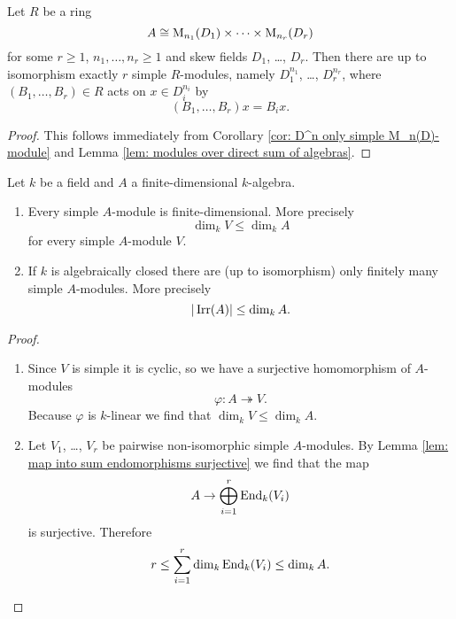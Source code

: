 \begin{cor}\label{cor: simple modules over product of matrix algebras}
  Let $R$ be a ring
  \[
                  A
    \cong         \operatorname{M}_{n_1}(D_1)
          \times  \dotsb
          \times  \operatorname{M}_{n_r}(D_r)
  \]
  for some $r \geq 1$, $n_1, \dotsc, n_r \geq 1$ and skew fields $D_1$, \dots, $D_r$.
  Then there are up to isomorphism exactly $r$ simple $R$-modules, namely $D_1^{n_1}$, \dots, $D_r^{n_r}$, where $(B_1, \dotsc, B_r) \in R$ acts on $x \in D_i^{n_i}$ by
  \[
      (B_1, \dotsc, B_r) x
    =  B_i x.
  \]
\end{cor}
\begin{proof}
  This follows immediately from Corollary \ref{cor: D^n only simple M_n(D)-module} and Lemma \ref{lem: modules over direct sum of algebras}.
\end{proof}


\begin{prop}\label{prop: simple modules over finite-dimensional algebras}
  Let $k$ be a field and $A$ a finite-dimensional $k$-algebra.
  \begin{enumerate}[label=\emph{\alph*)},leftmargin=*]
    \item
      Every simple $A$-module is finite-dimensional.
      More precisely
      \[
        \dim_k V \leq \dim_k A
      \]
      for every simple $A$-module $V$.
    \item
      If $k$ is algebraically closed there are (up to isomorphism) only finitely many simple $A$-modules. More precisely
      \[
        |\operatorname{Irr}(A)| \leq \dim_k A.
      \]
  \end{enumerate}
\end{prop}
\begin{proof}
  \begin{enumerate}[label=\emph{\alph*)},leftmargin=*]
    \item
      Since $V$ is simple it is cyclic, so we have a surjective homomorphism of $A$-modules
      \[
                            \varphi
        \colon              A
        \twoheadrightarrow  V.
      \]
      Because $\varphi$ is $k$-linear we find that $\dim_k V \leq \dim_k A$.
    \item
      Let $V_1$, \dots, $V_r$ be pairwise non-isomorphic simple $A$-modules. By Lemma \ref{lem: map into sum endomorphisms surjective} we find that the map
      \[
            A
        \to \bigoplus_{i=1}^r \operatorname{End}_k(V_i)
      \]
      is surjective. Therefore
      \[
              r
        \leq  \sum_{i=1}^r \dim_k \operatorname{End}_k(V_i)
        \leq  \dim_k A.
        \qedhere
      \]
  \end{enumerate}
\end{proof}


